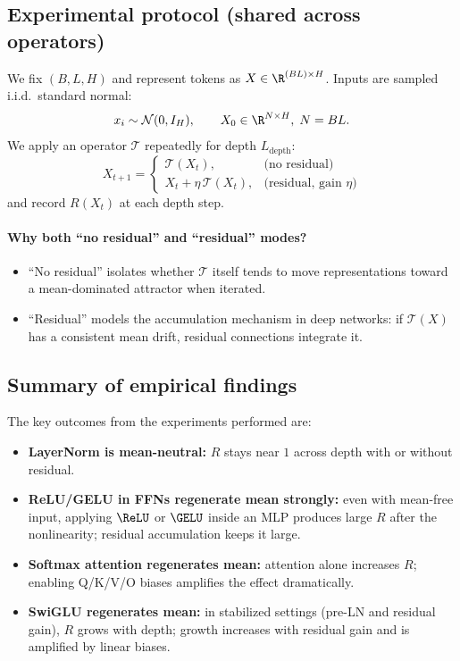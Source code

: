 \subsection{Experimental protocol (shared across operators)}

We fix $(B,L,H)$ and represent tokens as $X\in\R^{(BL)\times H}$.
Inputs are sampled i.i.d.\ standard normal:
\[
x_i \sim \mathcal{N}(0,I_H), \qquad X_0 \in \R^{N\times H}, \; N=BL.
\]
We apply an operator $\mathcal{T}$ repeatedly for depth $L_{\text{depth}}$:
\[
X_{t+1} =
\begin{cases}
\mathcal{T}(X_t), & \text{(no residual)}\\
X_t + \eta\,\mathcal{T}(X_t), & \text{(residual, gain $\eta$)}
\end{cases}
\]
and record $R(X_t)$ at each depth step.

\paragraph{Why both ``no residual'' and ``residual'' modes?}
\begin{itemize}
\item ``No residual'' isolates whether $\mathcal{T}$ itself tends to move representations toward a mean-dominated attractor when iterated.
\item ``Residual'' models the accumulation mechanism in deep networks: if $\mathcal{T}(X)$ has a consistent mean drift, residual connections integrate it.
\end{itemize}

\subsection{Summary of empirical findings}

The key outcomes from the experiments performed are:

\begin{itemize}
\item \textbf{LayerNorm is mean-neutral:} $R$ stays near $1$ across depth with or without residual.
\item \textbf{ReLU/GELU in FFNs regenerate mean strongly:} even with mean-free input, applying $\ReLU$ or $\GELU$ inside an MLP produces large $R$ after the nonlinearity; residual accumulation keeps it large.
\item \textbf{Softmax attention regenerates mean:} attention alone increases $R$; enabling Q/K/V/O biases amplifies the effect dramatically.
\item \textbf{SwiGLU regenerates mean:} in stabilized settings (pre-LN and residual gain), $R$ grows with depth; growth increases with residual gain and is amplified by linear biases.
\end{itemize}

